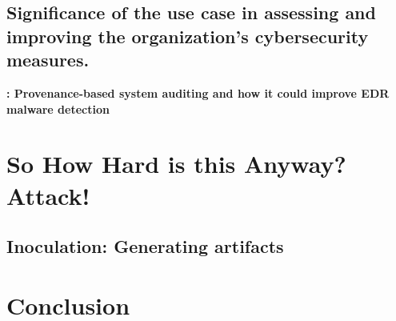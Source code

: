 \documentclass{article}
\begin{document}
\subsection{Significance of the use case in assessing and improving the organization's cybersecurity measures.}

\textbf{\textcite{Inam:2023}: Provenance-based system auditing and how it could improve EDR malware detection}


\pagebreak
\section{So How Hard is this Anyway?  Attack!}

\subsection{Inoculation: Generating artifacts}



\pagebreak
\section{Conclusion}

\pagebreak
\printbibliography
\end{document}

